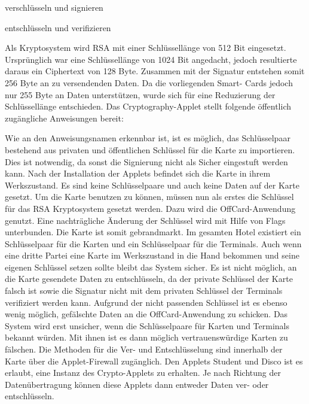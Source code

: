 verschlüsseln und signieren

entschlüsseln und verifizieren

Als Kryptosystem wird RSA mit einer Schlüssellänge von 512 Bit eingesetzt. Ursprünglich war eine Schlüssellänge von 1024 Bit angedacht, jedoch resultierte daraus ein Ciphertext von 128 Byte. Zusammen mit der Signatur entstehen somit 256 Byte an zu versendenden Daten. Da die vorliegenden Smart-
Cards jedoch nur 255 Byte an Daten unterstützen, wurde sich für eine Reduzierung der Schlüssellänge entschieden.
Das Cryptography-Applet stellt folgende öffentlich zugängliche Anweisungen bereit:


Wie an den Anweisungsnamen erkennbar ist, ist es möglich, das Schlüsselpaar bestehend aus privaten und öffentlichen Schlüssel für die Karte zu importieren. Dies ist notwendig, da sonst die Signierung nicht als Sicher eingestuft werden kann.
Nach der Installation der Applets befindet sich die Karte in ihrem Werkszustand. Es sind keine Schlüsselpaare und auch keine Daten auf der Karte gesetzt. 
Um die Karte benutzen zu können, müssen nun
als erstes die Schlüssel für das RSA Kryptosystem gesetzt werden. 
Dazu wird die OffCard-Anwendung genutzt. 
Eine nachträgliche Änderung der Schlüssel wird mit Hilfe von Flags unterbunden. Die Karte ist somit gebrandmarkt.
Im gesamten Hotel existiert ein Schlüsselpaar für die Karten und ein Schlüsselpaar für die Terminals.
Auch wenn eine dritte Partei eine Karte im Werkszustand in die Hand bekommen und seine eigenen Schlüssel setzen sollte bleibt das System sicher. Es ist nicht möglich, an die Karte gesendete Daten zu entschlüsseln, da der private Schlüssel der Karte falsch ist sowie die Signatur nicht mit dem privaten
Schlüssel der Terminals verifiziert werden kann. 
Aufgrund der nicht passenden Schlüssel ist es ebenso wenig möglich, gefälschte Daten an die OffCard-Anwendung zu schicken. Das System wird erst unsicher, wenn die Schlüsselpaare für Karten und Terminals bekannt würden. Mit ihnen ist es dann möglich vertrauenswürdige Karten zu fälschen.
Die Methoden für die Ver- und Entschlüsselung sind innerhalb der Karte über die Applet-Firewall zugänglich. Den Applets Student und Disco ist es erlaubt, eine Instanz des Crypto-Applets zu erhalten. 
Je nach Richtung der Datenübertragung können diese Applets dann entweder Daten ver- oder entschlüsseln. 

